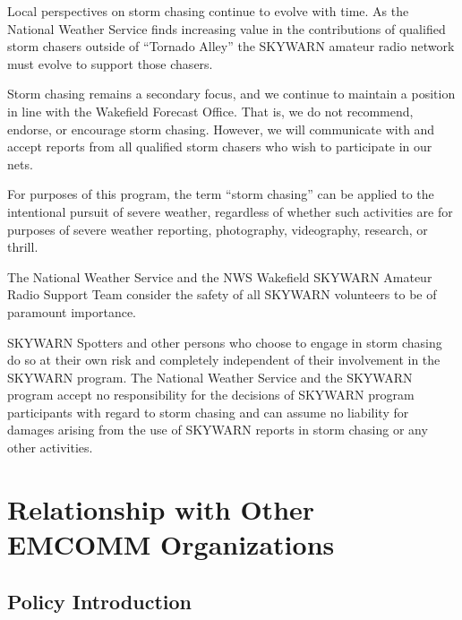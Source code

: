 \documentclass[pdflatex,letterpaper,twoside,12pt]{book}
\begin{document}
Local perspectives on storm chasing continue to evolve with time.  As the National Weather Service finds increasing value in the contributions of qualified storm chasers outside of ``Tornado Alley'' the SKYWARN amateur radio network must evolve to support those chasers.

Storm chasing remains a secondary focus, and we continue to maintain a position in line with the Wakefield Forecast Office.  That is, we do not recommend, endorse, or encourage storm chasing.  However, we will communicate with and accept reports from all qualified storm chasers who wish to participate in our nets.

For purposes of this program, the term ``storm chasing'' can be applied to the intentional pursuit of severe weather, regardless of whether such activities are for purposes of severe weather reporting, photography, videography, research, or thrill.

The National Weather Service and the NWS Wakefield SKYWARN Amateur Radio Support Team consider the safety of all SKYWARN volunteers to be of paramount importance.

SKYWARN Spotters and other persons who choose to engage in storm chasing do so at their own risk and completely independent of their involvement in the SKYWARN program.  The National Weather Service and the SKYWARN program accept no responsibility for the decisions of SKYWARN program participants with regard to storm chasing and can assume no liability for damages arising from the use of SKYWARN reports in storm chasing or any other activities.


\chapter{Relationship with Other EMCOMM Organizations}

\newcommand{\tpteam}{Third Party EMCOMM Team\ }

\newcommand{\tpteams}{Third Party EMCOMM Teams\ }

\section{Policy Introduction}
\end{document}
